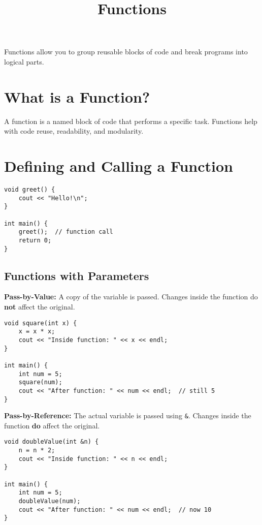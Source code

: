 \documentclass{article}
\title{Functions}
\author{}
\date{}
\begin{document}
\maketitle


Functions allow you to group reusable blocks of code and break programs into logical parts.

\section{What is a Function?}

A function is a named block of code that performs a specific task. Functions help with code reuse, readability, and modularity.

\section{Defining and Calling a Function}

\begin{lstlisting}[style=cppstyle]
void greet() {
    cout << "Hello!\n";
}

int main() {
    greet();  // function call
    return 0;
}
\end{lstlisting}

\subsection{Functions with Parameters}

\textbf{Pass-by-Value:} A copy of the variable is passed. Changes inside the function do \textbf{not} affect the original.

\begin{lstlisting}[style=cppstyle]
void square(int x) {
    x = x * x;
    cout << "Inside function: " << x << endl;
}

int main() {
    int num = 5;
    square(num);
    cout << "After function: " << num << endl;  // still 5
}
\end{lstlisting}

\textbf{Pass-by-Reference:} The actual variable is passed using \texttt{\&}. Changes inside the function \textbf{do} affect the original.

\begin{lstlisting}[style=cppstyle]
void doubleValue(int &n) {
    n = n * 2;
    cout << "Inside function: " << n << endl;
}

int main() {
    int num = 5;
    doubleValue(num);
    cout << "After function: " << num << endl;  // now 10
}
\end{lstlisting}
\end{document}
